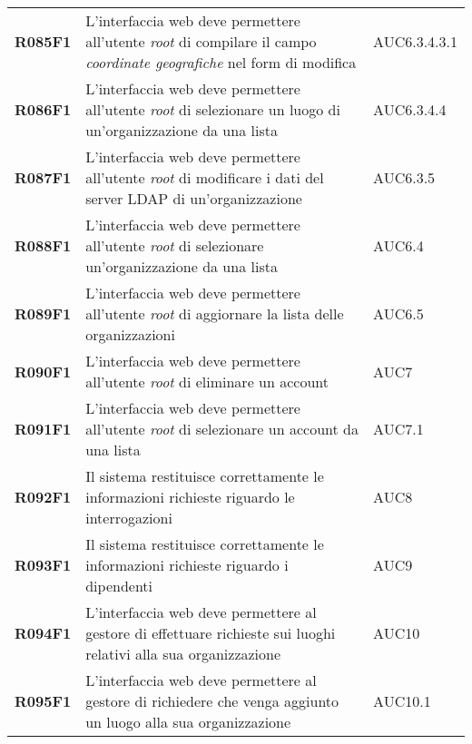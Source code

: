 \documentclass[../analisi-dei-requisiti.tex]{subfiles}
\begin{document}
\begin{longtable}[H]{>{\centering\bfseries}m{3cm} >{\centering}m{10cm} >{\centering\arraybackslash}m{3cm}}
  R085F1                  & L'interfaccia web deve permettere all'utente \textit{root} di compilare il campo \textit{coordinate geografiche} nel form di modifica          & AUC6.3.4.3.1                  \\
  R086F1                  & L'interfaccia web deve permettere all'utente \textit{root} di selezionare un luogo di un'organizzazione da una lista                           & AUC6.3.4.4                    \\
  R087F1                  & L'interfaccia web deve permettere all'utente \textit{root} di modificare i dati del server LDAP di un'organizzazione                           & AUC6.3.5                      \\
  R088F1                  & L'interfaccia web deve permettere all'utente \textit{root} di selezionare un'organizzazione da una lista                                       & AUC6.4                        \\
  R089F1                  & L'interfaccia web deve permettere all'utente \textit{root} di aggiornare la lista delle organizzazioni                                         & AUC6.5                        \\
  R090F1                  & L'interfaccia web deve permettere all'utente \textit{root} di eliminare un account                                                             & AUC7                          \\
  R091F1                  & L'interfaccia web deve permettere all'utente \textit{root} di selezionare un account da una lista                                              & AUC7.1                        \\
  R092F1                  & Il sistema restituisce correttamente le informazioni richieste riguardo le interrogazioni                                                      & AUC8                          \\
  R093F1                  & Il sistema restituisce correttamente le informazioni richieste riguardo i dipendenti                                                           & AUC9                          \\
  R094F1                  & L'interfaccia web deve permettere al gestore di effettuare richieste sui luoghi relativi alla sua organizzazione                                                         & AUC10                         \\
  R095F1                  & L'interfaccia web deve permettere al gestore di richiedere che venga aggiunto un luogo alla sua organizzazione                                 & AUC10.1                       \\

\end{longtable}
\end{document}
